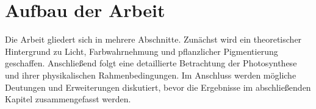 \section{Aufbau der Arbeit}
Die Arbeit gliedert sich in mehrere Abschnitte. Zunächst wird ein theoretischer Hintergrund zu Licht, Farbwahrnehmung und pflanzlicher Pigmentierung geschaffen. Anschließend folgt eine detaillierte Betrachtung der Photosynthese und ihrer physikalischen Rahmenbedingungen. Im Anschluss werden mögliche Deutungen und Erweiterungen diskutiert, bevor die Ergebnisse im abschließenden Kapitel zusammengefasst werden.
